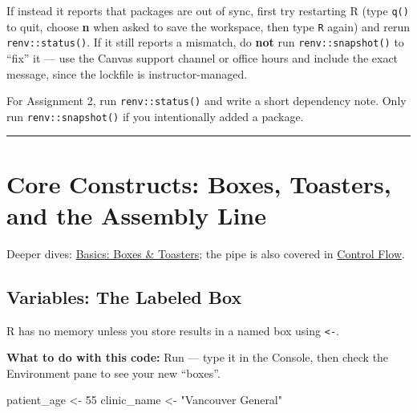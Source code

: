 \documentclass[
  letterpaper,
  DIV=11,
  numbers=noendperiod,
  oneside]{scrreprt}
\newenvironment{Shaded}{\begin{snugshade}}{\end{snugshade}}
\newcommand{\DecValTok}[1]{\textcolor[rgb]{0.68,0.00,0.00}{#1}}
\newcommand{\NormalTok}[1]{\textcolor[rgb]{0.00,0.23,0.31}{#1}}
\newcommand{\OtherTok}[1]{\textcolor[rgb]{0.00,0.23,0.31}{#1}}
\newcommand{\StringTok}[1]{\textcolor[rgb]{0.13,0.47,0.30}{#1}}
\begin{document}
If instead it reports that packages are out of sync, first try
restarting R (type \texttt{q()} to quit, choose \textbf{n} when asked to
save the workspace, then type \texttt{R} again) and rerun
\texttt{renv::status()}. If it still reports a mismatch, do \textbf{not}
run \texttt{renv::snapshot()} to ``fix'' it --- use the Canvas support
channel or office hours and include the exact message, since the
lockfile is instructor-managed.

For Assignment 2, run \texttt{renv::status()} and write a short
dependency note. Only run \texttt{renv::snapshot()} if you intentionally
added a package.

\begin{center}\rule{0.5\linewidth}{0.5pt}\end{center}

\section*{Core Constructs: Boxes, Toasters, and the Assembly
Line}\label{core-constructs-boxes-toasters-and-the-assembly-line}


Deeper dives: \href{r03-basics.qmd}{Basics: Boxes \& Toasters}; the pipe
is also covered in \href{r04-control-flow.qmd}{Control Flow}.

\subsection*{Variables: The Labeled
Box}\label{variables-the-labeled-box}

R has no memory unless you store results in a named box using
\texttt{\textless{}-}.

\textbf{What to do with this code:} Run --- type it in the Console, then
check the Environment pane to see your new ``boxes''.

\begin{Shaded}
\begin{Highlighting}[numbers=left,,]
\NormalTok{patient\_age }\OtherTok{\textless{}{-}} \DecValTok{55}
\NormalTok{clinic\_name }\OtherTok{\textless{}{-}} \StringTok{"Vancouver General"}
\end{Highlighting}
\end{Shaded}
\end{document}

